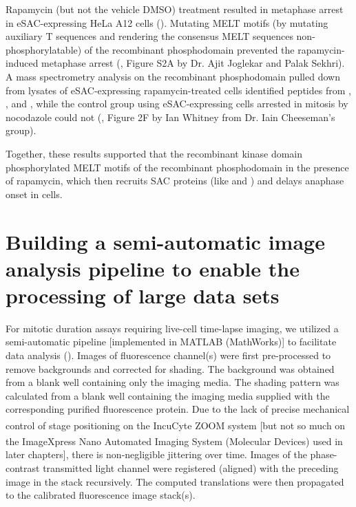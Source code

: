 Rapamycin (but not the vehicle DMSO) treatment resulted in metaphase arrest in eSAC-expressing HeLa A12 cells (). Mutating MELT motifs (by mutating auxiliary T\textOmega{} sequences \cite{RecombinantKNL1, MELTActivity} and rendering the consensus MELT sequences non-phosphorylatable) of the recombinant phosphodomain prevented the rapamycin-induced metaphase arrest (\cite{eSAC}, Figure S2A by Dr. Ajit Joglekar and Palak Sekhri). A mass spectrometry analysis on the recombinant phosphodomain pulled down from lysates of eSAC-expressing rapamycin-treated cells identified peptides from , , and , while the control group using eSAC-expressing cells arrested in mitosis by nocodazole could not (\cite{eSAC}, Figure 2F by Ian Whitney from Dr. Iain Cheeseman's group).

Together, these results supported that the recombinant  kinase domain phosphorylated MELT motifs of the recombinant  phosphodomain in the presence of rapamycin, which then recruits SAC proteins (like  and ) and delays anaphase onset in cells.

\section{Building a semi-automatic image analysis pipeline to enable the processing of large data sets}
For mitotic duration assays requiring live-cell time-lapse imaging, we utilized a semi-automatic pipeline [implemented in MATLAB (MathWorks)] to facilitate data analysis (). Images of fluorescence channel(s) were first pre-processed to remove backgrounds and corrected for shading. The background was obtained from a blank well containing only the imaging media. The shading pattern was calculated from a blank well containing the imaging media supplied with the corresponding purified fluorescence protein. Due to the lack of precise mechanical control of stage positioning on the IncuCyte\textsuperscript{\textregistered} ZOOM system [but not so much on the ImageXpress\textsuperscript{\textregistered} Nano Automated Imaging System (Molecular Devices) used in later chapters], there is non-negligible jittering over time. Images of the phase-contrast transmitted light channel were registered (aligned) with the preceding image in the stack recursively. The computed translations were then propagated to the calibrated fluorescence image stack(s).

